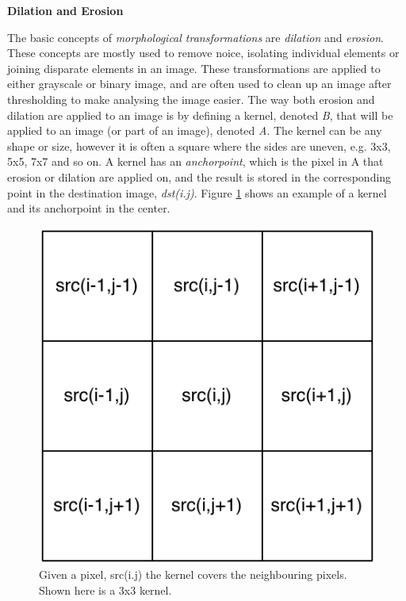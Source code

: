 \newpage

\noindent \textbf{Dilation and Erosion} \par

The basic concepts of \textit{morphological transformations} are \textit{dilation} and \textit{erosion}. These concepts are mostly used to remove noice, isolating individual elements or joining disparate elements in an image. These transformations are applied to either grayscale or binary image, and are often used to clean up an image after thresholding to make analysing the image easier. The way both erosion and dilation are applied to an image is by defining a kernel, denoted \textit{B}, that will be applied to an image (or part of an image), denoted \textit{A}. The kernel can be any shape or size, however it is often a square where the sides are uneven, e.g. 3x3, 5x5, 7x7 and so on. A kernel has an \textit{anchorpoint}, which is the pixel in A that erosion or dilation are applied on, and the result is stored in the corresponding point in the destination image, \textit{dst(i.j)}. Figure \ref{fig:kernel_ed} shows an example of a kernel and its anchorpoint in the center. \\

\begin{figure}[ht!]
  \centering
    \includegraphics[scale=0.50]{img/Kernel_ED.pdf}
  \caption{Given a pixel, src(i.j) the kernel covers the neighbouring pixels. Shown here is a 3x3 kernel.}
  \label{fig:kernel_ed}
\end{figure}

